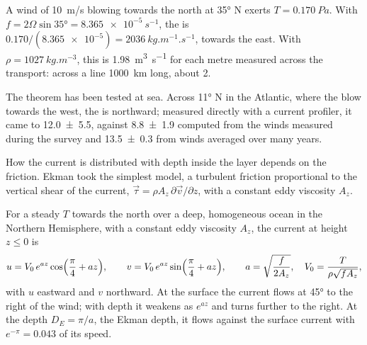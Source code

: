 \begin{example}\label{ex:b1:ocean-circulation:transport}
A wind of \qty{10}{m/s} blowing towards the north at \ang{35} N exerts
$T = \qty{0.170}{Pa}$. With $f = 2\Omega\sin\ang{35} = \qty{8.365e-5}{s^{-1}}$, the
 is $0.170/(\num{8.365e-5}) = \qty{2036}{kg.m^{-1}.s^{-1}}$, towards
the east. With $\rho = \qty{1027}{kg.m^{-3}}$, this is \qty{1.98}{m^3.s^{-1}} for
each metre measured across the transport: across a line \qty{1000}{km} long, about
\qty{2}{\sverdrup}.
\end{example}

The theorem has been tested at sea. Across \ang{11} N in the Atlantic, where the
 blow towards the west, the  is northward; measured
directly with a current profiler, it came to
\qty[uncertainty-mode=separate]{12.0 \pm 5.5}{\sverdrup}, against
\qty[uncertainty-mode=separate]{8.8 \pm 1.9}{\sverdrup} computed from the winds
measured during the survey and
\qty[uncertainty-mode=separate]{13.5 \pm 0.3}{\sverdrup} from winds averaged over
many years.

How the current is distributed with depth inside the layer depends on the
friction. Ekman took the simplest model, a turbulent friction proportional to the
vertical shear of the current, $\vec\tau = \rho A_z\,\partial\vec v/\partial z$, with
a constant eddy viscosity $A_z$.

\begin{proposition}\label{prop:b1:ocean-circulation:spiral}
For a steady  $T$ towards the north over a deep, homogeneous ocean in the
Northern Hemisphere, with a constant eddy viscosity $A_z$, the current at height $z
\leq 0$ is
\[
  u = V_0\,e^{az}\cos\Bigl(\frac\pi4 + az\Bigr),\qquad
  v = V_0\,e^{az}\sin\Bigl(\frac\pi4 + az\Bigr),\qquad
  a = \sqrt{\frac{f}{2A_z}},\quad V_0 = \frac{T}{\rho\sqrt{fA_z}},
\]
with $u$ eastward and $v$ northward. At the surface the current flows at \ang{45} to
the right of the wind; with depth it weakens as $e^{az}$ and turns further to the
right. At the depth $D_E = \pi/a$, the Ekman depth, it flows against the surface
current with $e^{-\pi} = \num{0.043}$ of its speed.
\end{proposition}
\admitted

